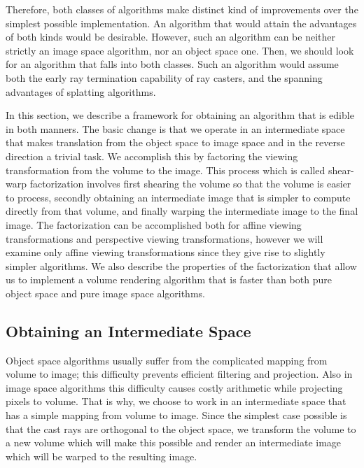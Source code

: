 \documentclass[a4paper,12pt]{article}
\begin{document}
Therefore, both classes of algorithms make distinct kind of
improvements over the simplest possible implementation. An algorithm
that would attain the advantages of both kinds would be desirable.
However, such an algorithm can be neither strictly an image space
algorithm, nor an object space one. Then, we should look for an
algorithm that falls into both classes. Such an algorithm would assume
both the early ray termination capability of ray casters, and the
spanning advantages of splatting algorithms.

In this section, we describe a framework for obtaining an algorithm
that is edible in both manners. The basic change is that we operate in
an intermediate space that makes translation from the object space to
image space and in the reverse direction a trivial task. We accomplish
this by factoring the viewing transformation from the volume to the
image. This process which is called shear-warp factorization involves
first shearing the volume so that the volume is easier to process,
secondly obtaining an intermediate image that is simpler to compute
directly from that volume, and finally warping the intermediate image
to the final image. The factorization can be accomplished both for
affine viewing transformations and perspective viewing
transformations, however we will examine only affine viewing
transformations since they give rise to slightly simpler algorithms.
We also describe the properties of the factorization that allow us to
implement a volume rendering algorithm that is faster than both pure
object space and pure image space algorithms.

\subsection{Obtaining an Intermediate Space}

Object space algorithms usually suffer from the complicated mapping
from volume to image; this difficulty prevents efficient filtering and
projection. Also in image space algorithms this difficulty causes
costly arithmetic while projecting pixels to volume. That is why, we
choose to work in an intermediate space that has a simple mapping from
volume to image. Since the simplest case possible is that the cast
rays are orthogonal to the object space, we transform the volume to a
new volume which will make this possible and render an intermediate
image which will be warped to the resulting image.
\end{document}
